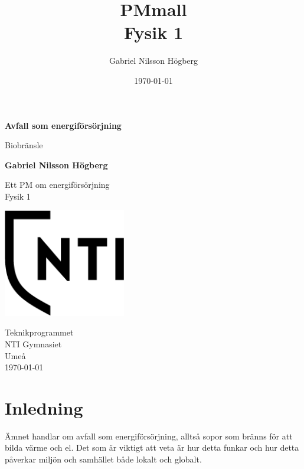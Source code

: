 \documentclass[11p]{article}
\title{PMmall \\ \small Fysik 1}
\author{Gabriel Nilsson Högberg}
\date{\today}
\begin{document}
    \begin{titlepage}
        \begin{center}
            \vspace*{1cm}

            \Huge
            \textbf{Avfall som energiförsörjning}

            \vspace{0.5cm}
            \LARGE
            Biobränsle

            \vspace{1.5cm}

            \textbf{Gabriel Nilsson Högberg}

            \vfill

            Ett PM om energiförsörjning \\
            Fysik 1

            \vspace{0.8cm}

            \includegraphics[width=0.4\textwidth]{../images/NTI Gymnasiet_Symbol_print_svart.png}

            \Large
            Teknikprogrammet\\
            NTI Gymnasiet\\
            Umeå\\
            \today

        \end{center}
    \end{titlepage}
    \tableofcontents
    \newpage

    \section{Inledning}
    Ämnet handlar om avfall som energiförsörjning, alltså sopor som bränns för att bilda värme och el. Det som är viktigt att veta är hur detta funkar och hur detta påverkar miljön och samhället både lokalt och globalt.
\end{document}
